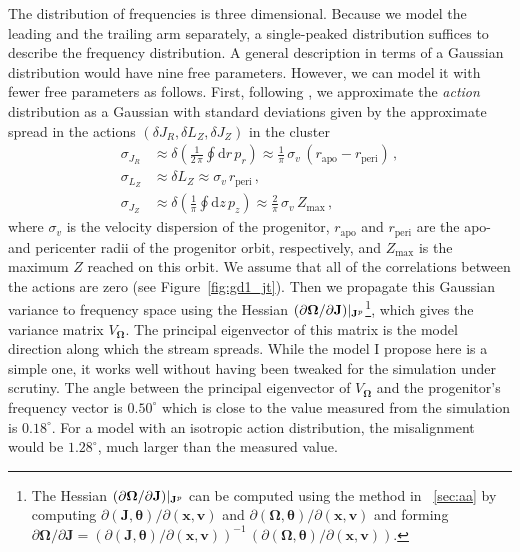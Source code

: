 \documentclass[12pt,preprint]{aastex}
\newcommand{\dd}{\mathrm{d}}
\renewcommand{\figurename}{Figure}
\renewcommand{\vec}[1]{\ensuremath{\mathbf{#1}}}
\newcommand{\vecx}{\ensuremath{\vec{x}}}
\newcommand{\vecv}{\ensuremath{\vec{v}}}
\newcommand{\vecj}{\ensuremath{\vec{J}}}
\newcommand{\veco}{\ensuremath{\vec{\Omega}}}
\newcommand{\veca}{\ensuremath{\boldsymbol\theta}}
\newcommand{\sigv}{\ensuremath{\sigma_v}}
\begin{document}
The distribution of frequencies is three dimensional. Because we model
the leading and the trailing arm separately, a single-peaked
distribution suffices to describe the frequency distribution. A
general description in terms of a Gaussian distribution would have
nine free parameters. However, we can model it with fewer free
parameters as follows. First, following \citet{Eyre11a}, we
approximate the \emph{action} distribution as a Gaussian with standard
deviations given by the approximate spread in the actions $(\delta
J_R,\delta L_Z,\delta J_Z)$ in the cluster
\begin{align}
  \sigma_{J_R} & \approx \delta \left(\frac{1}{2\,\pi}\oint\dd r\,p_r\right) \approx \frac{1}{\pi}\,\sigv\,\left(r_{\mathrm{apo}}-r_{\mathrm{peri}}\right)\,,\\
  \sigma_{L_Z} & \approx  \delta L_Z \approx \sigv\,r_{\mathrm{peri}}\,,\\
  \sigma_{J_Z} & \approx \delta\left(\frac{1}{\pi}\oint\dd z\,p_z \right)\approx \frac{2}{\pi}\,\sigv\,Z_{\mathrm{max}}\,,
\end{align}
where $\sigv$ is the velocity dispersion of the progenitor,
$r_{\mathrm{apo}}$ and $r_{\mathrm{peri}}$ are the apo- and pericenter
radii of the progenitor orbit, respectively, and $Z_{\mathrm{max}}$ is
the maximum $Z$ reached on this orbit. We assume that all of the
correlations between the actions are zero (see
\figurename~\ref{fig:gd1_jt}). Then we propagate this Gaussian
variance to frequency space using the Hessian $(\partial \veco /
\partial \vecj)\large|_{\vecj^p}$\footnote{The Hessian $(\partial
  \veco / \partial \vecj)\large|_{\vecj^p}$ can be computed using the
  method in \appendixname~\ref{sec:aa} by computing $\partial
  (\vecj,\veca) / \partial (\vecx,\vecv)$ and $\partial (\veco,\veca)
  / \partial (\vecx,\vecv)$ and forming $\partial \veco / \partial
  \vecj = \left(\partial (\vecj,\veca) / \partial
  (\vecx,\vecv)\right)^{-1}\,\left(\partial (\veco,\veca) / \partial
  (\vecx,\vecv)\right)$.}, which gives the variance matrix
$V_\veco$. The principal eigenvector of this matrix is the model
direction along which the stream spreads. While the model I propose
here is a simple one, it works well without having been tweaked for
the simulation under scrutiny. The angle between the principal
eigenvector of $V_\veco$ and the progenitor's frequency vector is
$0.50^\circ$ which is close to the value measured from the simulation
is $0.18^\circ$. For a model with an isotropic action distribution,
the misalignment would be $1.28^\circ$, much larger than the measured
value.
\end{document}

